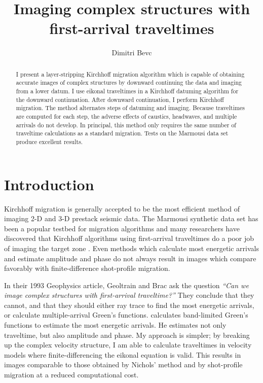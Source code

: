 \title{Imaging complex structures with first-arrival traveltimes}
\author{Dimitri Bevc}
\def\figdir{./Fig}

\begin{abstract}
I present a layer-stripping Kirchhoff migration algorithm which is
capable of obtaining accurate
images of complex structures by downward continuing
the data and imaging from a lower datum.
I use eikonal traveltimes in a Kirchhoff datuming algorithm for the
downward continuation. After downward continuation, I perform
Kirchhoff migration. 
The method alternates steps of datuming and imaging. Because traveltimes
are computed for each step, the adverse effects of caustics, headwaves, and 
multiple arrivals do not develop.
In principal, this method only requires the same number of
traveltime calculations as a standard migration.
Tests on the Marmousi data set produce excellent results.
\end{abstract}

\section{Introduction}
Kirchhoff migration is generally accepted to be the most efficient
method of imaging 2-D and 3-D prestack seismic data.  The Marmousi
synthetic data set \cite[]{TLE13-09-09270936} has been a popular
testbed for migration algorithms and many researchers have discovered
that Kirchhoff algorithms using first-arrival traveltimes do a poor
job of imaging the target zone
\cite[]{Audebert.sep.80.47,GEO59-05-08100817,GEO58-04-05640575}.  Even
methods which calculate most energetic arrivals and estimate amplitude
and phase do not always result in images which compare favorably with
finite-difference shot-profile migration.

In their 1993 Geophysics article, Geoltrain and Brac ask the
question {\em ``Can we image complex structures with first-arrival
traveltime?''} They conclude that they cannot, and that they should 
either ray trace to find the most energetic arrivals, or calculate
multiple-arrival Green's functions. \cite{Nichols.sepphd.81} calculates 
band-limited Green's functions to estimate the most energetic
arrivals. He estimates not only traveltime, but also amplitude and
phase. My approach is simpler; by breaking up the complex
velocity structure, I am able 
to calculate traveltimes in velocity models where
finite-differencing the eikonal equation is valid.
This results in images comparable to those obtained by 
Nichols' method and by shot-profile migration at a reduced
computational cost.

